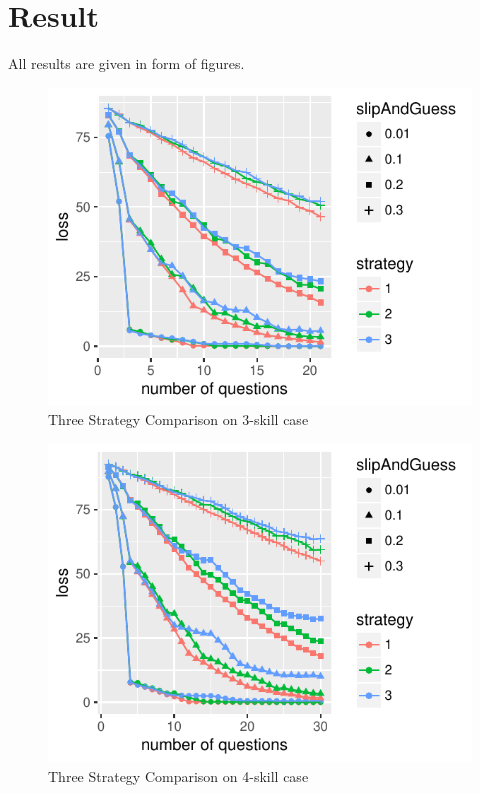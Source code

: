 \documentclass{edm_template}
\begin{document}
\section{Result}
All results are given in form of figures.
\begin{figure}[h!]
  \begin{center}
  \includegraphics[width=\columnwidth]{simResults/LossStrategyComparisonThreeSkills.pdf}
  \end{center}
  \caption{Three Strategy Comparison on 3-skill case}  
  \label{fig:ComparisonThreeSkill}
\end{figure}

\begin{figure}[h!]
  \begin{center}
  \includegraphics[width=\columnwidth]{simResults/LossStrategyComparisonFourSkills.pdf}
  \end{center}
  \caption{Three Strategy Comparison on 4-skill case}  
  \label{fig:ComparisonFourSkill}
\end{figure}
\end{document}

